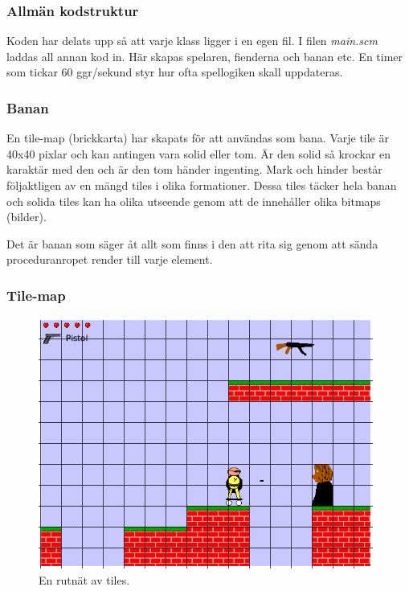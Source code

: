 \documentclass{scrartcl}
\begin{document}
\subsubsection{Allmän kodstruktur}

Koden har delats upp så att varje klass ligger i en egen fil. I filen \textsl{main.scm} laddas all annan kod in. Här skapas spelaren, fienderna och banan etc. En timer som tickar 60 ggr/sekund styr hur ofta spellogiken skall uppdateras. 

\subsubsection{Banan}
En tile-map (brickkarta) har skapats för att användas som bana. Varje tile är 40x40 pixlar och kan antingen vara solid eller tom. Är den solid så krockar en karaktär med den och är den tom händer ingenting. Mark och hinder består följaktligen av en mängd tiles i olika formationer. Dessa tiles täcker hela banan och solida tiles kan ha olika utseende genom att de innehåller olika bitmaps (bilder).

Det är banan som säger åt allt som finns i den att rita sig genom att sända proceduranropet render till varje element. 

\subsubsection{Tile-map}

\begin{figure}[h!]
\centering
\includegraphics[width=11cm]{tilekoordinater}
\caption{En rutnät av tiles.}\label{tile-rutnat}
\end{figure}
\end{document}
